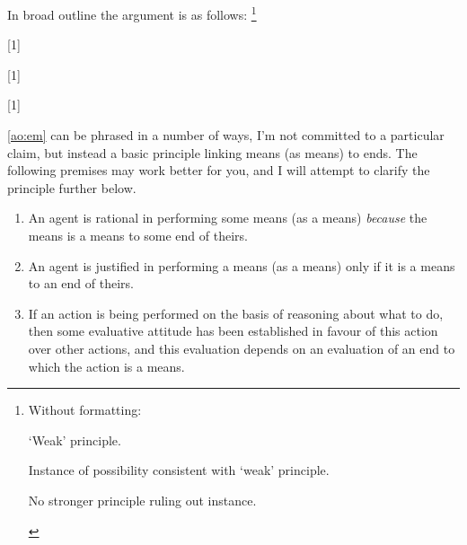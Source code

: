 \documentclass[10pt]{article}
\begin{document}
\newpage

\noindent In broad outline the argument is as follows:\nolinebreak
\footnote{Without formatting:
  \begin{enumerate*}[label={\color{lightgray} \arabic*.}, ref={\color{lightgray} (\arabic*)}]
  \item `Weak' principle.
  \item Instance of possibility consistent with `weak' principle.
  \item No stronger principle ruling out instance.
  \end{enumerate*}
}

\begin{enumerate}[label={\color{lightgray} \scalebox{1.5}[1]{\arabic*.}}, ref={\color{lightgray} (\arabic*)}]
\item {\color{white} \scalebox{1.275}[1]{}}
\item {\color{white} \scalebox{1.275}[1]{}}
\item {\color{white} \scalebox{1.275}[1]{}}
\end{enumerate}


\ref{ao:em} can be phrased in a number of ways, I'm not committed to a particular claim, but instead a basic principle linking means (as means) to ends.
The following premises may work better for you, and I will attempt to clarify the principle further below.

\begin{enumerate}[label=1.\alph*.]
\item An agent is rational in performing some means (as a means) \emph{because} the means is a means to some end of theirs.
\item An agent is justified in performing a means (as a means) only if it is a means to an end of theirs.
\item If an action is being performed on the basis of reasoning about what to do, then some evaluative attitude has been established in favour of this action over other actions, and this evaluation depends on an evaluation of an end to which the action is a means.
\end{enumerate}
\end{document}
